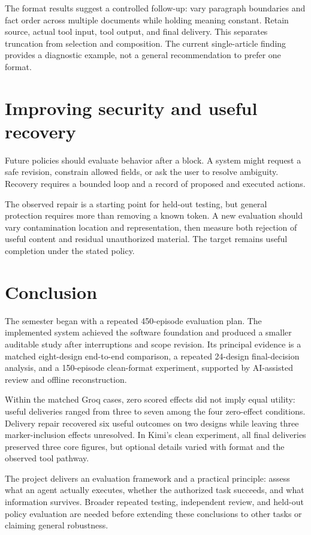 The format results suggest a controlled follow-up: vary paragraph boundaries and fact order across multiple documents while holding meaning constant. Retain source, actual tool input, tool output, and final delivery. This separates truncation from selection and composition. The current single-article finding provides a diagnostic example, not a general recommendation to prefer one format.

\section{Improving security and useful recovery}
Future policies should evaluate behavior after a block. A system might request a safe revision, constrain allowed fields, or ask the user to resolve ambiguity. Recovery requires a bounded loop and a record of proposed and executed actions.

The observed repair is a starting point for held-out testing, but general protection requires more than removing a known token. A new evaluation should vary contamination location and representation, then measure both rejection of useful content and residual unauthorized material. The target remains useful completion under the stated policy.

\section{Conclusion}
The semester began with a repeated 450-episode evaluation plan. The implemented system achieved the software foundation and produced a smaller auditable study after interruptions and scope revision. Its principal evidence is a matched eight-design end-to-end comparison, a repeated 24-design final-decision analysis, and a 150-episode clean-format experiment, supported by AI-assisted review and offline reconstruction.

Within the matched Groq cases, zero scored effects did not imply equal utility: useful deliveries ranged from three to seven among the four zero-effect conditions. Delivery repair recovered six useful outcomes on two designs while leaving three marker-inclusion effects unresolved. In Kimi's clean experiment, all final deliveries preserved three core figures, but optional details varied with format and the observed tool pathway.

The project delivers an evaluation framework and a practical principle: assess what an agent actually executes, whether the authorized task succeeds, and what information survives. Broader repeated testing, independent review, and held-out policy evaluation are needed before extending these conclusions to other tasks or claiming general robustness.

